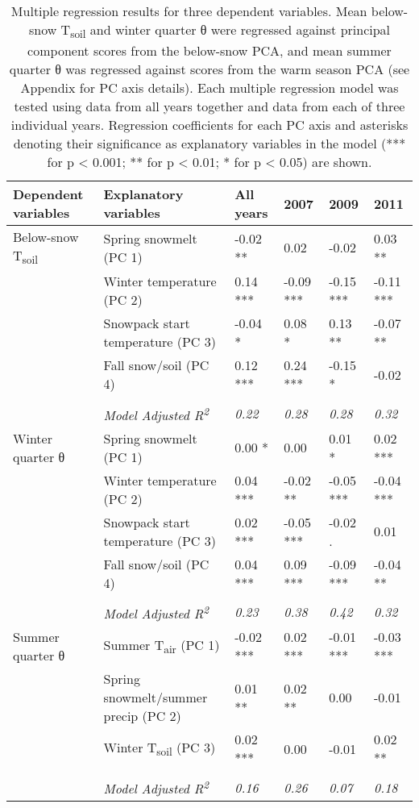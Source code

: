 
\begin{sidewaystable}

\centering

\caption{Multiple regression results for three dependent variables. Mean below-snow T\textsubscript{soil} and winter quarter θ were regressed against principal component scores from the below-snow PCA, and mean summer quarter θ was regressed against scores from the warm season PCA (see Appendix for PC axis details). Each multiple regression model was tested using data from all years together and data from each of three individual years. Regression coefficients for each PC axis and asterisks denoting their significance as explanatory variables in the model (*** for p < 0.001; ** for p < 0.01; * for p < 0.05) are shown.\label{regression_pca_t}}

\begin{tabular}{llllll}
\toprule

Dependent variables & Explanatory variables & All years & 2007 & 2009 & 2011\\
\midrule
Below-snow T\textsubscript{soil}	&Spring snowmelt (PC 1)	&-0.02	**	&0.02		&-0.02		&0.03	** \\
	&Winter temperature (PC 2)	&0.14	***	&-0.09	***	&-0.15	***	&-0.11	*** \\
	&Snowpack start temperature (PC 3)	&-0.04	*	&0.08	*	&0.13	**	&-0.07	**	 \\
	&Fall snow/soil (PC 4)	&0.12	***	&0.24	***	&-0.15	*	&-0.02		 \\
	&	&	&	&	&\\
 &\emph{Model Adjusted R\textsuperscript{2}}	&\emph{0.22}	&\emph{0.28}	&\emph{0.28}	&\emph{0.32}	 \\
\midrule
Winter quarter θ	&Spring snowmelt (PC 1)	&0.00	*	&0.00		&0.01	*	&0.02	*** \\
	&Winter temperature (PC 2)	&0.04	***	&-0.02	**	&-0.05	***	&-0.04	*** \\
	&Snowpack start temperature (PC 3)	&0.02	***	&-0.05	***	&-0.02	.	&0.01	 \\
	&Fall snow/soil (PC 4)	&0.04	***	&0.09	***	&-0.09	***	&-0.04	** \\
	&	&	&	&	&\\
 &\emph{Model Adjusted R\textsuperscript{2}}	&\emph{0.23}	&\emph{0.38}	&\emph{0.42}	&\emph{0.32} \\
\midrule
Summer quarter θ	&Summer T\textsubscript{air} (PC 1)	&-0.02	***	&0.02	***	&-0.01	***	&-0.03	*** \\
	&Spring snowmelt/summer precip (PC 2)	&0.01	**	&0.02	**	&0.00		&-0.01	 \\
    &Winter T\textsubscript{soil} (PC 3)	&0.02	***	&0.00		&-0.01		&0.02	** \\
	&	&	&	&	&\\
 &\emph{Model Adjusted R\textsuperscript{2}}	&\emph{0.16}	&\emph{0.26}	&\emph{0.07}	&\emph{0.18}	 \\
\bottomrule
\end{tabular}

\end{sidewaystable}
